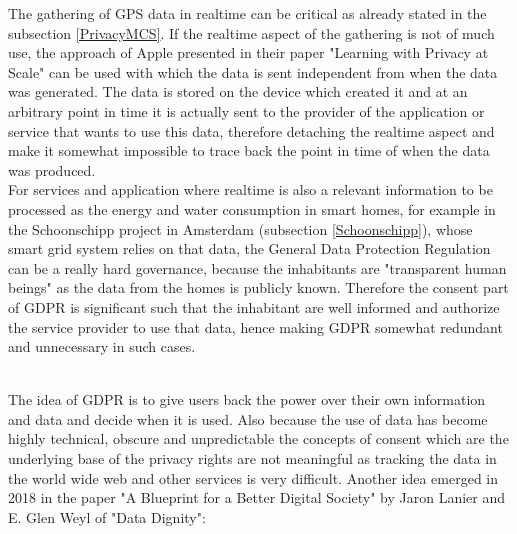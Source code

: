 \documentclass[a4paper,12pt]{report}
\begin{document}
		The gathering of GPS data in realtime can be critical as already stated in the subsection \ref{PrivacyMCS}. If the realtime aspect of the gathering is not of much use, the approach of Apple presented in their paper "Learning with Privacy at Scale" \cite{PrivacyApple} can be used with which the data is sent independent from when the data was generated. The data is stored on the device which created it and at an arbitrary point in time it is actually sent to the provider of the application or service that wants to use this data, therefore detaching the realtime aspect and make it somewhat impossible to trace back the point in time of when the data was produced. \\
		For services and application where realtime is also a relevant information to be processed as the energy and water consumption in smart homes, for example in the Schoonschipp project in Amsterdam (subsection \ref{Schoonschipp}), whose smart grid system relies on that data, the General Data Protection Regulation can be a really hard governance, because the inhabitants are "transparent human beings" as the data from the homes is publicly known. Therefore the consent part of GDPR is significant such that the inhabitant are well informed and authorize the service provider to use that data, hence making GDPR somewhat redundant and unnecessary in such cases.
	\closesection
	
	\hfill \\
	\noindent The idea of GDPR is to give users back the power over their own information and data and decide when it is used. Also because the use of data has become highly technical, obscure and unpredictable the concepts of consent which are the underlying base of the privacy rights are not meaningful as tracking the data in the world wide web and other services is very difficult. Another idea emerged in 2018 in the paper "A Blueprint for a Better Digital Society" by Jaron Lanier and E. Glen Weyl of "Data Dignity":
	
\end{document}
